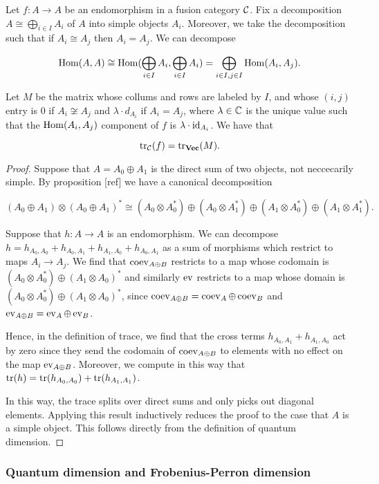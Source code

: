 \begin{cor} Let $f:A\to A$ be an endomorphism in a fusion category ${\mathcal C}$. Fix a decomposition $A\cong \bigoplus_{i\in I}A_i$ of $A$ into simple objects $A_i$. Moreover, we take the decomposition such that if $A_i\cong A_j$ then $A_i=A_j$. We can decompose

$$\operatorname{Hom}(A,A)\cong \operatorname{Hom}(\bigoplus_{i\in I} A_i,\bigoplus_{i\in I}A_i)=\bigoplus_{i\in I, j\in I}\operatorname{Hom}(A_i,A_j).$$

Let $M$ be the matrix whose collums and rows are labeled by $I$, and whose $(i,j)$ entry is $0$ if $A_i\not\cong A_j$ and $\lambda \cdot d_{A_i}$ if $A_i=A_j$, where $\lambda\in {\mathbb C}$ is the unique value such that the $\operatorname{Hom}(A_i,A_j)$ component of $f$ is $\lambda\cdot \operatorname{id}_{A_i}$. We have that

$$\operatorname{tr}_{{\mathcal C}}(f)=\operatorname{tr}_{{\bf Vec}}(M).$$

\end{cor}
\begin{proof} Suppose that $A=A_0\oplus A_1$ is the direct sum of two objects, not neccecarily simple. By proposition [ref] we have a canonical decomposition

$$(A_0\oplus A_1)\otimes (A_0\oplus A_1)^*\cong (A_0\otimes A_0^*) \oplus (A_0\otimes A_1^*) \oplus (A_1\otimes A_0^{*})\oplus (A_1\otimes A_1^*).$$

Suppose that $h:A\to A$ is an endomorphism. We can decompose $h=h_{A_0,A_0}+h_{A_0,A_1}+h_{A_1,A_0}+h_{A_0,A_1}$ as a sum of morphisms which restrict to maps $A_i\to A_j$. We find that $\operatorname{coev}_{A\oplus B}$ restricts to a map whose codomain is  $(A_0\otimes A_0^*) \oplus (A_1\otimes A_0)^*$ and similarly $\operatorname{ev}$ restricts to a map whose domain is $(A_0\otimes A_0^*) \oplus (A_1\otimes A_0)^*$, since $\operatorname{coev}_{A\oplus B}=\operatorname{coev}_{A}\oplus \operatorname{coev}_{B}$ and $\operatorname{ev}_{A\oplus B}=\operatorname{ev}_{A}\oplus \operatorname{ev}_{B}$.

Hence, in the definition of trace, we find that the cross terms $h_{A_0,A_1}+h_{A_1,A_0}$ act by zero since they send the codomain of $\operatorname{coev}_{A\oplus B}$ to elements with no effect on the map $\operatorname{ev}_{A\oplus B}$. Moreover, we compute in this way that $\operatorname{tr}(h)=\operatorname{tr}(h_{A_0,A_0})+\operatorname{tr}(h_{A_1,A_1})$.

In this way, the trace splits over direct sums and only picks out diagonal elements. Applying this result inductively reduces the proof to the case that $A$ is a simple object. This follows directly from the definition of quantum dimension.
\end{proof}


\subsubsection{Quantum dimension and Frobenius-Perron dimension}

